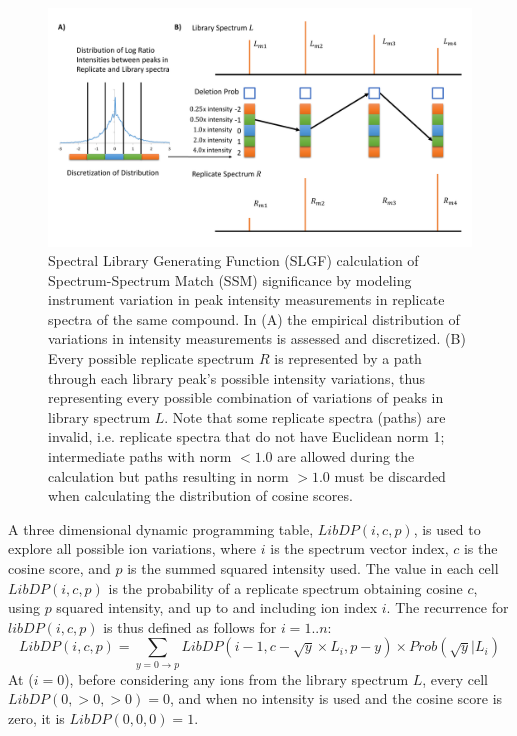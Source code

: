 \documentclass[endnotes,11pt]{article}
\begin{document}
\begin{figure}[h!]
 \centering
	\includegraphics[scale=0.50]{SLGFPaths2.pdf}
	\vspace{-0.30in}
  \caption{Spectral Library Generating Function (SLGF) calculation of Spectrum-Spectrum Match (SSM) significance by modeling instrument variation in peak intensity measurements in replicate spectra of the same compound. In (A) the empirical distribution of variations in intensity measurements is assessed and discretized. (B) Every possible replicate spectrum $R$ is represented by a path through each library peak's possible intensity variations, thus representing every possible combination of variations of peaks in library spectrum $L$. Note that some replicate spectra (paths) are invalid, i.e. replicate spectra that do not have Euclidean norm 1; intermediate paths with norm $<1.0$ are allowed during the calculation but paths resulting in norm $>1.0$ must be discarded when calculating the distribution of cosine scores. }
	\label{Paths}
\end{figure}


A three dimensional dynamic programming table, $LibDP(i,c,p)$, is used to explore all possible ion variations, where $i$ is the spectrum vector index, $c$ is the cosine score, and $p$ is the summed squared intensity used. The value in each cell $LibDP(i,c,p)$ is the probability of a replicate spectrum obtaining cosine $c$, using $p$ squared intensity, and up to and including ion index $i$.
The recurrence for $libDP(i,c,p)$ is thus defined as follows for $i=1..n$:
$$
LibDP(i,c,p) = \sum_{y=0\rightarrow p}
   LibDP( i-1, c-\sqrt{y}\times L_i, p-y ) \times Prob( \sqrt{y} | L_i)
$$
At ($i=0$), before considering any ions from the library spectrum $L$, every cell $LibDP(0, >0, >0) = 0$, and when no intensity is used and the cosine score is zero, it is $LibDP(0,0,0) = 1$.
\end{document}
